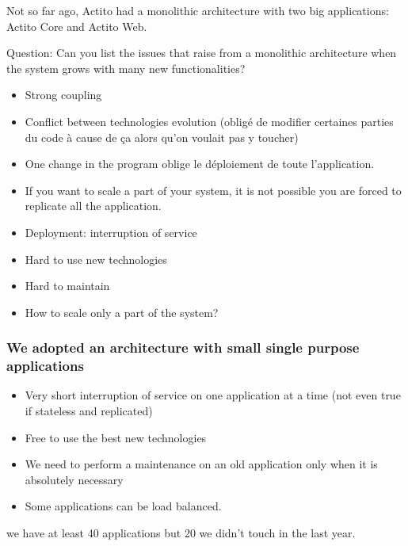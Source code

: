 \documentclass[a4paper, 11pt]{article}
\begin{document}
    Not so far ago, Actito had a monolithic architecture with two big applications:
    Actito Core and Actito Web.

    Question: Can you list the issues that raise from a monolithic architecture
    when the system grows with many new functionalities?

    \begin{itemize}
        \item Strong coupling
        \item Conflict between technologies evolution (obligé de modifier certaines parties du code
        à cause de ça alors qu'on voulait pas y toucher)
        \item One change in the program oblige le déploiement de toute l'application.
        \item If you want to scale a part of your system, it is not possible you are forced to replicate all the application.
    \end{itemize}

    \begin{itemize}
        \item Deployment: interruption of service
        \item Hard to use new technologies
        \item Hard to maintain
        \item How to scale only a part of the system?
    \end{itemize}

    \subsubsection{We adopted an architecture with small single purpose applications}

    \begin{itemize}
        \item Very short interruption of service on one application at a time (not even
        true if stateless and replicated)
        \item Free to use the best new technologies
        \item We need to perform a maintenance on an old application only when it is
        absolutely necessary
        \item Some applications can be load balanced.
    \end{itemize}

    we have at least 40 applications but 20 we didn't touch in the last year.
\end{document}
